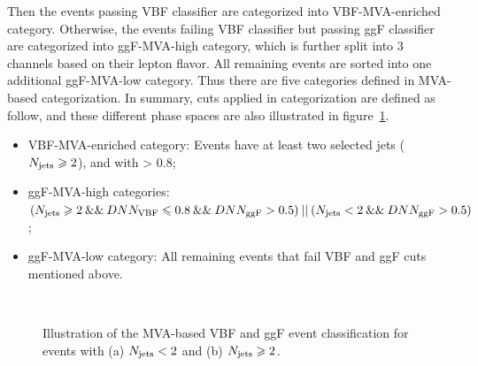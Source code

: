 Then the events passing VBF classifier are categorized into VBF-MVA-enriched category.
Otherwise, the events failing VBF classifier but passing ggF classifier are categorized into ggF-MVA-high category, which is further split into 3 channels based on their lepton flavor.
All remaining events are sorted into one additional ggF-MVA-low category.
Thus there are five categories defined in MVA-based categorization.
In summary, cuts applied in categorization are defined as follow, and these different phase spaces are also illustrated in figure~\ref{fig:hmhzz_dnncate}.

\begin{itemize}
	\item VBF-MVA-enriched category: Events have at least two selected jets ($N_{\mathrm{jets}}  \geqslant 2$), and with \DNNVBF > 0.8;
	\item ggF-MVA-high categories: $(N_{\mathrm{jets}}  \geqslant 2 \:\&\&\: DNN_{\mathrm{VBF}} \leqslant 0.8 \:\&\&\: DNN_{\mathrm{ggF}} > 0.5) \:||\: (N_{\mathrm{jets}}  < 2 \:\&\&\: DNN_{\mathrm{ggF}} > 0.5)$; 
	\item ggF-MVA-low category: All remaining events that fail VBF and ggF cuts mentioned above.
\end{itemize}

\begin{figure}[h]
\centering
{}
\\
\caption{Illustration of the MVA-based VBF and ggF event classification for events with (a) $N_{\mathrm{jets}}  < 2$ and (b) $N_{\mathrm{jets}}  \geqslant 2$.}
\label{fig:hmhzz_dnncate}
\end{figure}

